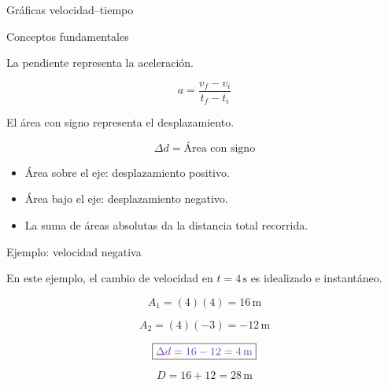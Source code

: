 \documentclass[aspectratio=169,10pt]{beamer}
\newcommand{\resultado}[1]{
\[
\boxed{\color{morado}#1}
\]
}
\begin{document}
\begin{frame}{Gráficas velocidad--tiempo}

\begin{block}{Conceptos fundamentales}

La pendiente representa la aceleración.

\[
\boxed{
a=\frac{v_f-v_i}{t_f-t_i}
}
\]

El área con signo representa
el desplazamiento.

\[
\boxed{
\Delta d=\text{Área con signo}
}
\]

\end{block}

\begin{itemize}
\item Área sobre el eje: desplazamiento positivo.
\item Área bajo el eje: desplazamiento negativo.
\item La suma de áreas absolutas da
la distancia total recorrida.
\end{itemize}

\end{frame}

\begin{frame}{Ejemplo: velocidad negativa}

\begin{center}
\end{center}

\small
En este ejemplo, el cambio de velocidad
en $t=4\,\mathrm{s}$ es idealizado
e instantáneo.

\[
A_1=(4)(4)=16\,\mathrm{m}
\]

\[
A_2=(4)(-3)=-12\,\mathrm{m}
\]

\resultado{\Delta d=16-12=4\,\mathrm{m}}

\[
D=16+12=28\,\mathrm{m}
\]

\end{frame}
\end{document}
